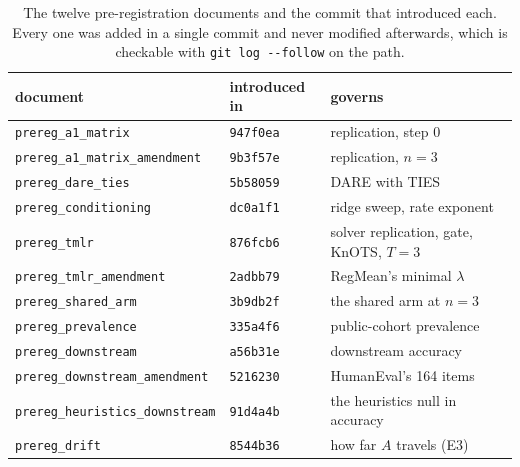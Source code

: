 \begin{table}[htb]
\centering
\small
\caption{The twelve pre-registration documents and the commit that introduced
each. Every one was added in a single commit and never modified afterwards,
which is checkable with \texttt{git log -{}-follow} on the path.}
\label{tab:prereg-docs}
\begin{tabular}{lll}
\toprule
document & introduced in & governs \\
\midrule
\texttt{prereg\_a1\_matrix} & \texttt{947f0ea} & replication, step 0 \\
\texttt{prereg\_a1\_matrix\_amendment} & \texttt{9b3f57e} & replication, $n=3$ \\
\texttt{prereg\_dare\_ties} & \texttt{5b58059} & DARE with TIES \\
\texttt{prereg\_conditioning} & \texttt{dc0a1f1} & ridge sweep, rate exponent \\
\texttt{prereg\_tmlr} & \texttt{876fcb6} & solver replication, gate, KnOTS, $T=3$ \\
\texttt{prereg\_tmlr\_amendment} & \texttt{2adbb79} & RegMean's minimal $\lambda$ \\
\texttt{prereg\_shared\_arm} & \texttt{3b9db2f} & the shared arm at $n=3$ \\
\texttt{prereg\_prevalence} & \texttt{335a4f6} & public-cohort prevalence \\
\texttt{prereg\_downstream} & \texttt{a56b31e} & downstream accuracy \\
\texttt{prereg\_downstream\_amendment} & \texttt{5216230} & HumanEval's 164 items \\
\texttt{prereg\_heuristics\_downstream} & \texttt{91d4a4b} & the heuristics null in accuracy \\
\texttt{prereg\_drift} & \texttt{8544b36} & how far $A$ travels (E3) \\
\bottomrule
\end{tabular}
\end{table}

